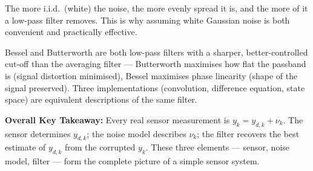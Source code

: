 \documentclass[12pt, a4paper]{article}
\begin{document}
The more i.i.d.\ (white) the noise, the more evenly spread it is, and
the more of it a low-pass filter removes. This is why assuming white
Gaussian noise is both convenient and practically effective.

Bessel and Butterworth are both low-pass filters with a sharper,
better-controlled cut-off than the averaging filter --- Butterworth
maximises how flat the passband is (signal distortion minimised),
Bessel maximises phase linearity (shape of the signal preserved).
Three implementations (convolution, difference equation, state space)
are equivalent descriptions of the same filter.

\begin{keybox}
  \textbf{Overall Key Takeaway:} Every real sensor measurement is
  $y_k = y_{d,k} + \nu_k$. The sensor determines $y_{d,k}$; the noise
  model describes $\nu_k$; the filter recovers the best estimate of
  $y_{d,k}$ from the corrupted $y_k$. These three elements --- sensor,
  noise model, filter --- form the complete picture of a simple sensor
  system.
\end{keybox}
\end{document}
